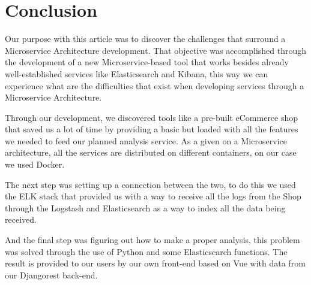 \section{Conclusion}
Our purpose with this article was to discover the challenges that surround a Microservice Architecture development. That objective was accomplished through the development of a new Microservice-based tool that works besides already well-established services like Elasticsearch and Kibana, this way we can experience what are the difficulties that exist when developing services through a Microservice Architecture.

Through our development, we discovered tools like a pre-built eCommerce shop that saved us a lot of time by providing a basic but loaded with all the features we needed to feed our planned analysis service. As a given on a Microservice architecture, all the services are distributed on different containers, on our case we used Docker. 

The next step was setting up a connection between the two, to do this we used the ELK stack that provided us with a way to receive all the logs from the Shop through the Logstash and Elasticsearch as a way to index all the data being received.

And the final step was figuring out how to make a proper analysis, this problem was solved through the use of Python and some Elasticsearch functions. The result is provided to our users by our own front-end based on Vue with data from our Djangorest back-end.